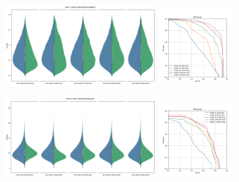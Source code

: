 \begin{figure}[!ht]
    \centering
    \includegraphics[width=0.6\textwidth]{../images/realworldexperiments/scarlatti/violinplots/TrainVsFake_noteLengthTransMatrix.png}
    \includegraphics[width=0.3\textwidth]{../images/realworldexperiments/scarlatti/prcurves/PRCurveScarlatti_noteLengthTransMatrix.png}
\end{figure}   
\begin{figure}[!ht]
    \centering
    \includegraphics[width=0.6\textwidth]{../images/realworldexperiments/scarlatti/violinplots/TrainVsFake_nPitchesPerMeasure.png}
    \includegraphics[width=0.3\textwidth]{../images/realworldexperiments/scarlatti/prcurves/PRCurveScarlatti_nPitchesPerMeasure.png}
\end{figure}  
